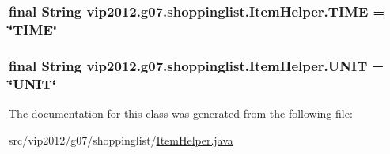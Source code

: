 \hypertarget{classvip2012_1_1g07_1_1shoppinglist_1_1ItemHelper_af4ed8a9409f4623fb7755b37431ad5c0}{
\subsubsection[{T\-I\-M\-E}]{\setlength{\rightskip}{0pt plus 5cm}final String vip2012.\-g07.\-shoppinglist.\-Item\-Helper.\-T\-I\-M\-E = \char`\"{}T\-I\-M\-E\char`\"{}\hspace{0.3cm}{\ttfamily [static]}}}\label{d9/d0d/classvip2012_1_1g07_1_1shoppinglist_1_1ItemHelper_af4ed8a9409f4623fb7755b37431ad5c0}
\hypertarget{classvip2012_1_1g07_1_1shoppinglist_1_1ItemHelper_a4b2f6f4439ec7a2ecc1a7bc24805a2cb}{
\subsubsection[{U\-N\-I\-T}]{\setlength{\rightskip}{0pt plus 5cm}final String vip2012.\-g07.\-shoppinglist.\-Item\-Helper.\-U\-N\-I\-T = \char`\"{}U\-N\-I\-T\char`\"{}\hspace{0.3cm}{\ttfamily [static]}}}\label{d9/d0d/classvip2012_1_1g07_1_1shoppinglist_1_1ItemHelper_a4b2f6f4439ec7a2ecc1a7bc24805a2cb}


The documentation for this class was generated from the following file\-:\begin{DoxyCompactItemize}
\item 
src/vip2012/g07/shoppinglist/\hyperlink{ItemHelper_8java}{Item\-Helper.\-java}\end{DoxyCompactItemize}
